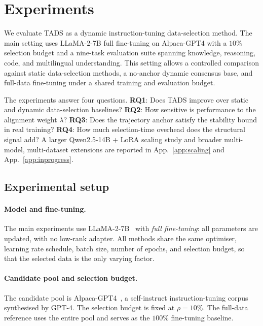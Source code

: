 \section{Experiments}
\label{sec:experiments}

We evaluate \textsc{TADS} as a dynamic instruction-tuning
data-selection method. The main setting uses LLaMA-2-7B full
fine-tuning on Alpaca-GPT4 with a $10\%$ selection budget and a
nine-task evaluation suite spanning knowledge, reasoning, code, and
multilingual understanding. This setting allows a controlled
comparison against static data-selection methods, a no-anchor
dynamic consensus base, and full-data fine-tuning under a shared
training and evaluation budget.

The experiments answer four questions. \textbf{RQ1}: Does
\textsc{TADS} improve over static and dynamic data-selection
baselines? \textbf{RQ2}: How sensitive is performance to the
alignment weight $\lambda$? \textbf{RQ3}: Does the trajectory anchor
satisfy the stability bound in real training? \textbf{RQ4}: How much
selection-time overhead does the structural signal add? A larger
Qwen2.5-14B + LoRA scaling study and broader multi-model,
multi-dataset extensions are reported in App.~\ref{app:scaling} and
App.~\ref{app:inprogress}.

\subsection{Experimental setup}
\label{sec:setup}

\paragraph{Model and fine-tuning.}
The main experiments use LLaMA-2-7B~\cite{touvron2023llama2} with
\emph{full fine-tuning}: all parameters are updated, with no
low-rank adapter. All methods share the same optimiser, learning
rate schedule, batch size, number of epochs, and selection budget,
so that the selected data is the only varying factor.

\paragraph{Candidate pool and selection budget.}
The candidate pool is Alpaca-GPT4~\cite{alpaca_gpt4}, a
self-instruct instruction-tuning corpus synthesised by GPT-4. The
selection budget is fixed at $\rho=10\%$. The full-data reference
uses the entire pool and serves as the $100\%$ fine-tuning baseline.

